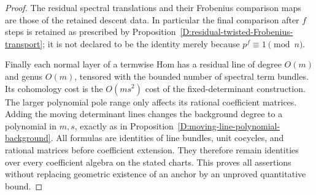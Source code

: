 \begin{proof}
The residual spectral translations and their Frobenius
comparison maps are those of the retained descent data.
In particular the final comparison after $f$ steps is
retained as prescribed by
Proposition~\ref{D:residual-twisted-Frobenius-transport};
it is not declared to be the identity merely because
$p^f\equiv1\pmod n$.

Finally each normal layer of a termwise Hom has a residual
line of degree $O(m)$ and genus $O(m)$, tensored with the
bounded number of spectral term bundles. Its cohomology
cost is the $O(ms^2)$ cost of the fixed-determinant
construction. The larger polynomial pole range only
affects its rational coefficient matrices. Adding the
moving determinant lines changes the background degree
to a polynomial in $m,s$, exactly as in
Proposition~\ref{D:moving-line-polynomial-background}.
All formulas are identities of line bundles, unit
cocycles, and rational matrices before coefficient
extension. They therefore remain identities over every
coefficient algebra on the stated charts. This proves
all assertions without replacing geometric existence
of an anchor by an unproved quantitative bound.
\end{proof}
